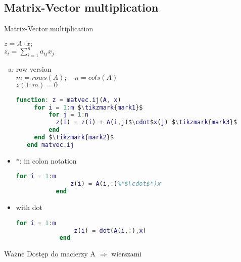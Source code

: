\subsection{Matrix-Vector multiplication}

\begin{frame}[fragile]{Matrix-Vector multiplication}

$z = A \cdot x; $ \\
$z_i = \sum_{i=1}^n a_{i j}  x_j $ \\ 
\vspace{10px}
\begin{enumerate}[a)]
	\item row version \\
	$m = rows(A); \quad n = cols(A)$ \\
	$z(1:m) = 0$
\vspace{10px}

\begin{lstlisting}[language=Matlab, mathescape]
  function: z = matvec.ij(A, x)
     for i = 1:m $\tikzmark{mark1}$
         for j = 1:n
	       z(i) = z(i) + A(i,j)$\cdot$x(j) $\tikzmark{mark3}$
         end
     end $\tikzmark{mark2}$
   end matvec.ij\end{lstlisting}
\end{enumerate}
\end{frame}

\begin{frame}[fragile]
	\begin{itemize} %
		\item $*$: in colon notation
		\vspace{7px}
		 \begin{lstlisting}[language=Matlab]
		   for i = 1:m
		       z(i) = A(i,:)%*$\cdot$*)x
		   end\end{lstlisting}

		 \item with dot
		 \vspace{7px}
		  \begin{lstlisting}[language=Matlab]
		    for i = 1:m
		        z(i) = dot(A(i,:),x)
		    end\end{lstlisting}
	\end{itemize}
 \begin{alertblock}{Ważne}
Dostęp do macierzy A $\Rightarrow$ wierszami
  \end{alertblock}

\end{frame}

